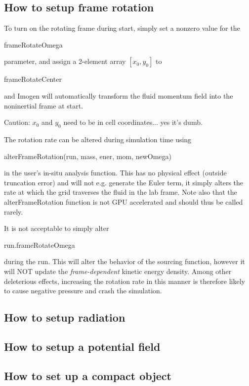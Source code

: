 \documentclass[letterpaper,12pt]{article}
\begin{document}
\subsection{How to setup frame rotation}

To turn on the rotating frame during start, simply set a nonzero value for the \begin{tt}frameRotateOmega\end{tt}
parameter, and assign a 2-element array $\left[x_0, y_0\right]$ to \begin{tt}frameRotateCenter\end{tt}
and Imogen will automatically transform the fluid momentum field into the noninertial frame at start.

Caution: $x_0$ and $y_0$ need to be in cell coordinates... yes it's dumb.

The rotation rate can be altered during simulation time using 
\begin{tt}
alterFrameRotation(run, mass,\newline
ener, mom, newOmega)
\end{tt}
in the user's in-situ analysis function. This has no physical effect (outside truncation error)
and will not e.g. generate the Euler term, it simply alters the rate at which the grid traverses
the fluid in the lab frame. Note also that the alterFrameRotation function is not GPU accelerated
and should thus be called rarely.

It is not acceptable to simply alter \begin{tt}run.frameRotateOmega\end{tt} during the run.
This will alter the behavior of the sourcing function, however it will NOT update the
\textit{frame-dependent} kinetic energy density. Among other deleterious effects, increasing the rotation
rate in this manner is therefore likely to cause negative pressure and crash the simulation.

\subsection{How to setup radiation}

\subsection{How to setup a potential field}

\subsection{How to set up a compact object}
\end{document}
